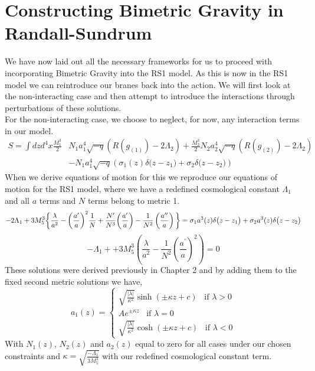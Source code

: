 \documentclass[11pt]{report}
\numberwithin{equation}{chapter}
\begin{document}
\chapter{Constructing Bimetric Gravity in Randall-Sundrum}
We have now laid out all the necessary frameworks for us to proceed with incorporating Bimetric Gravity into the RS1 model. As this is now in the RS1 model we can reintroduce our branes back into the action. We will first look at the non-interacting case and then attempt to introduce the interactions through perturbations of these solutions. \\
For the non-interacting case, we choose to neglect, for now, any interaction terms in our model.
\begin{align}
    S=\int dzd^4x\frac{M_1^{3}}{2}&N_1a_1^4\sqrt{-q}\left(R(g_{(1)})-2\Lambda _2\right)+ \frac{M_2^{3}}{2}N_2a_2^4\sqrt{-q}\left(R(g_{(2)})-2\Lambda _2\right)\\
    &-N_1a_1^4\sqrt{-q}\left(\sigma_1(z)\delta\big(z-z_1\big)+\sigma_2\delta\big(z-z_2\big)\right)
\end{align}
When we derive equations of motion for this we reproduce our equations of motion for the RS1 model, where we have a redefined cosmological constant $\Lambda_1$ and all $a$ terms and $N$ terms belong to metric 1. 
\begin{equation}
-2\Lambda_1+3M_5^3\bigg\{\frac{\lambda}{a^2}-\bigg(\frac{a^\prime}{a}\bigg)^2\frac{1}{N}+\frac{N^\prime}{N^3}\bigg(\frac{a^\prime}{a}\bigg)-\frac{1}{N^2}\left(\frac{a^{\prime\prime}}{a}\right)\bigg\}=\\
\sigma_1a^3(z)\delta\big(z-z_1\big)+\sigma_2a^3(z)\delta\big(z-z_2\big)
\end{equation}
\begin{equation}
     -\Lambda_1++3M^3_5\left(\frac{\lambda}{a^2}-\frac{1}{N^2}\left(\frac{a^\prime}{a}\right)^2\right)=0
\end{equation}
These solutions were derived previously in Chapter 2 and by adding them to the fixed second metric solutions we have,\\
\begin{equation}
    a_1\left(z\right)=
    \begin{cases}
        \sqrt{\frac{|\lambda |}{\kappa^2}}\sinh\left(\pm\kappa z+c\right)\hspace{10pt}\text{if } \lambda > 0\\[10pt]
        Ae^{\pm\kappa z}\hspace{10pt}\text{if } \lambda = 0\\[10pt]
        \sqrt{\frac{|\lambda |}{\kappa^2}}\cosh\left(\pm\kappa z+c\right) \hspace{10pt}\text{if } \lambda < 0
    \end{cases}
\end{equation}
With $N_1(z)$, $N_2(z)$ and $a_2(z)$ equal to zero for all cases under our chosen constraints and $\kappa = \sqrt{\frac{-\Lambda_1}{3M^3_5}}$ with our redefined cosmological constant term.
\end{document}
